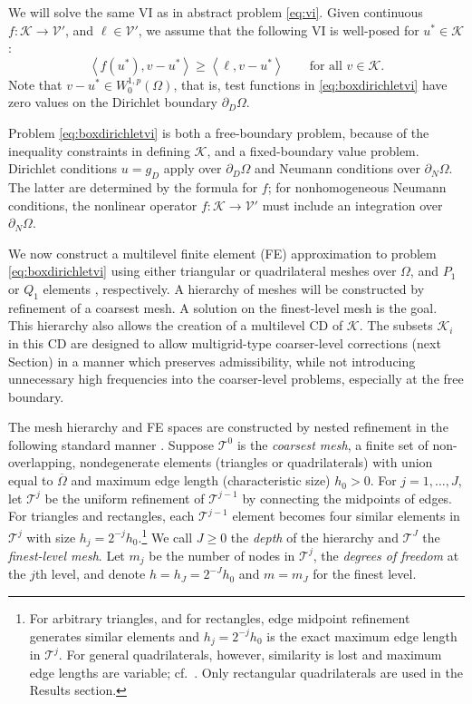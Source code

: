 \documentclass[letterpaper,final,12pt,reqno]{amsart}
\theoremstyle{cstyle}
\theoremstyle{cstyle*}
\theoremstyle{dstyle}
\numberwithin{equation}{section}
\numberwithin{figure}{section}
\numberwithin{table}{section}
\numberwithin{theorem}{section}
\newcommand{\cK}{\mathcal{K}}
\newcommand{\cV}{\mathcal{V}}
\newcommand{\ip}[2]{\left<#1,#2\right>}
\begin{document}
We will solve the same VI as in abstract problem \eqref{eq:vi}.  Given continuous $f:\cK \to \cV'$, and $\ell \in \cV'$, we assume that the following VI is well-posed for $u^*\in \cK$:
\begin{equation}
\ip{f(u^*)}{v-u^*} \ge \ip{\ell}{v-u^*} \qquad \text{for all } v\in \cK. \label{eq:boxdirichletvi}
\end{equation}
Note that $v-u^* \in W_0^{1,p}(\Omega)$, that is, test functions in \eqref{eq:boxdirichletvi} have zero values on the Dirichlet boundary $\partial_D\Omega$.

Problem \eqref{eq:boxdirichletvi} is both a free-boundary problem, because of the inequality constraints in defining $\cK$, and a fixed-boundary value problem.   Dirichlet conditions $u=g_D$ apply over $\partial_D\Omega$ and Neumann conditions over $\partial_N \Omega$.  The latter are determined by the formula for $f$; for nonhomogeneous Neumann conditions, the nonlinear operator $f:\cK\to\cV'$ must include an integration over $\partial_N\Omega$.

We now construct a multilevel finite element (FE) approximation to problem \eqref{eq:boxdirichletvi} using either triangular or quadrilateral meshes over $\Omega$, and $P_1$ or $Q_1$ elements \cite{Elmanetal2014}, respectively.  A hierarchy of meshes will be constructed by refinement of a coarsest mesh.  A solution on the finest-level mesh is the goal.  This hierarchy also allows the creation of a multilevel CD of $\cK$.  The subsets $\cK_i$ in this CD are designed to allow multigrid-type coarser-level corrections (next Section) in a manner which preserves admissibility, while not introducing unnecessary high frequencies into the coarser-level problems, especially at the free boundary.

The mesh hierarchy and FE spaces are constructed by nested refinement in the following standard manner \cite{Elmanetal2014}.  Suppose $\mathcal{T}^0$ is the \emph{coarsest mesh}, a finite set of non-overlapping, nondegenerate elements (triangles or quadrilaterals) with union equal to $\overline{\Omega}$ and maximum edge length (characteristic size) $h_0>0$.  For $j=1,\dots,J$, let $\mathcal{T}^j$ be the uniform refinement of $\mathcal{T}^{j-1}$ by connecting the midpoints of edges.  For triangles and rectangles, each $\mathcal{T}^{j-1}$ element becomes four similar elements in $\mathcal{T}^j$ with size $h_j = 2^{-j} h_0$.\footnote{For arbitrary triangles, and for rectangles, edge midpoint refinement generates similar elements and $h_j=2^{-j}h_0$ is the exact maximum edge length in $\mathcal{T}^j$.  For general quadrilaterals, however, similarity is lost and maximum edge lengths are variable; cf.~\cite{Zhang2004}.  Only rectangular quadrilaterals are used in the Results section.}  We call $J\ge 0$ the \emph{depth} of the hierarchy and $\mathcal{T}^J$ the \emph{finest-level mesh}.  Let $m_j$ be the number of nodes in $\mathcal{T}^j$, the \emph{degrees of freedom} at the $j$th level, and denote $h=h_J=2^{-J} h_0$ and $m=m_J$ for the finest level.
\end{document}
